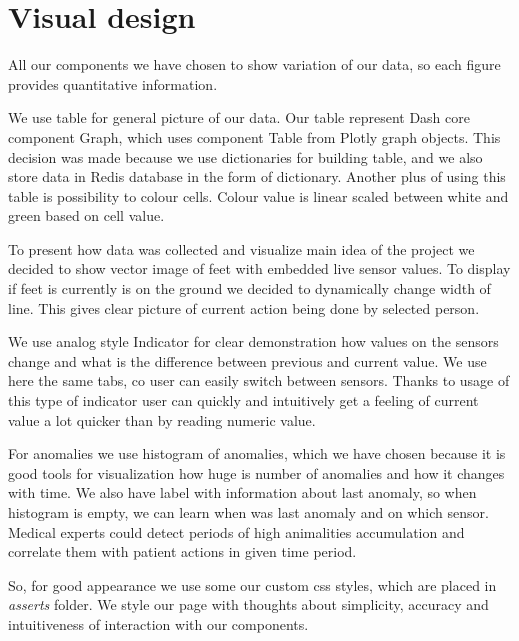 \documentclass{article}
\begin{document}
\section{Visual design}

All our components we have chosen to show variation of our data, so each figure provides quantitative information.
\vspace{10pt}

We use table for general picture of our data. Our table represent Dash core component Graph, which uses component Table from Plotly graph objects. This decision was made because we use dictionaries for building table, and we also store data in Redis database in the form of dictionary. Another plus of using this table is possibility to colour cells. Colour value is linear scaled between white and green based on cell value.
\vspace{10pt}

To present how data was collected and visualize main idea of the project we decided to show vector image of feet with embedded live sensor values. To display if feet is currently is on the ground we decided to dynamically change width of line. This gives clear picture of current action being done by selected person. 
\vspace{10pt}

We use analog style Indicator for clear demonstration how values on the sensors change and what is the difference between previous and current value. We use here the same tabs, co user can easily switch between sensors. Thanks to usage of this type of indicator user can quickly and intuitively get a feeling of current value a lot quicker than by reading numeric value.
\vspace{10pt}

For anomalies we use histogram of anomalies, which we have chosen because it is good tools for visualization how huge is number of anomalies and how it changes with time. We also have label with information about last anomaly, so when histogram is empty, we can learn when was last anomaly and on which sensor. Medical experts could detect periods of high animalities accumulation and correlate them with patient actions in given time period.
\vspace{10pt}

So, for good appearance we use some our custom css styles, which are placed in \textit{asserts} folder. We style our page with thoughts about simplicity, accuracy and intuitiveness of interaction with our components.
\end{document}
